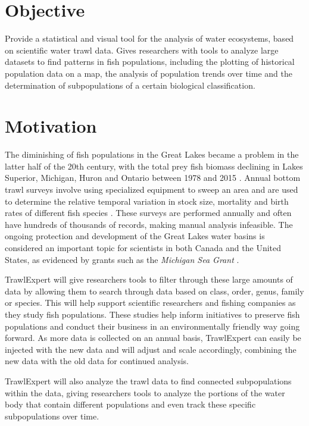 \documentclass{article}
\begin{document}
\section{Objective}
Provide a statistical and visual tool for the analysis of water ecosystems, based on scientific water trawl data. Gives researchers with tools to analyze large datasets to find patterns in fish populations, including the plotting of historical population data on a map, the analysis of population trends over time and the determination of subpopulations of a certain biological classification.

\section{Motivation}
The diminishing of fish populations in the Great Lakes became a problem in the latter half of the 20th century, with the total prey fish biomass declining in Lakes Superior, Michigan, Huron and Ontario between 1978 and 2015 \citep{michigan2017}. Annual bottom trawl surveys involve using specialized equipment to sweep an area and are used to determine the relative temporal variation in stock size, mortality and birth rates of different fish species \citep{walsh1997efficiency}. These surveys are performed annually and often have hundreds of thousands of records, making manual analysis infeasible. The ongoing protection and development of the Great Lakes water basins is considered an important topic for scientists in both Canada and the United States, as evidenced by grants such as the \textit{Michigan Sea Grant} \citep{michseagr2018}.

TrawlExpert will give researchers tools to filter through these large amounts of data by allowing them to search through data based on class, order, genus, family or species. This will help support scientific researchers and fishing companies as they study fish populations. These studies help inform initiatives to preserve fish populations and conduct their business in an environmentally friendly way going forward. As more data is collected on an annual basis, TrawlExpert can easily be injected with the new data and will adjust and scale accordingly, combining the new data with the old data for continued analysis.

TrawlExpert will also analyze the trawl data to find connected subpopulations within the data, giving researchers tools to analyze the portions of the water body that contain different populations and even track these specific subpopulations over time.
\end{document}
